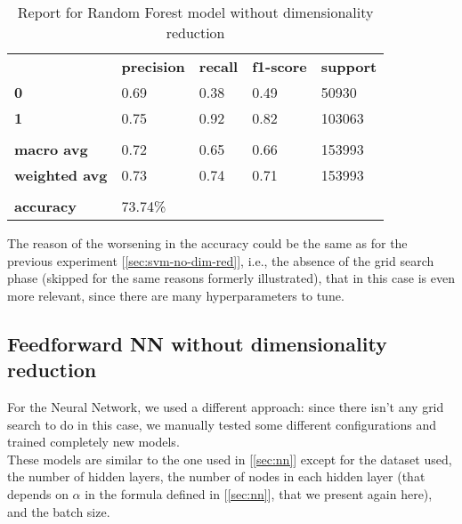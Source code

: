 \begin{table}[h!]
    \centering
    \begin{tabular}{lllll}
        \rowcolor[HTML]{EEEEEE} 
        \cellcolor[HTML]{FBFBFB} & \textbf{precision} & \textbf{recall} & \textbf{f1-score} & \textbf{support} \\
        \rowcolor[HTML]{EEEEEE} 
        \textbf{0}               & 0.69               & 0.38            & 0.49              & 50930            \\
        \rowcolor[HTML]{EEEEEE} 
        \textbf{1}               & 0.75               & 0.92            & 0.82              & 103063           \\
        \rowcolor[HTML]{FBFBFB} 
        &                    &                 &                   &                  \\
        \rowcolor[HTML]{EEEEEE} 
        \textbf{macro avg}       & 0.72               & 0.65            & 0.66              & 153993           \\
        \rowcolor[HTML]{EEEEEE} 
        \textbf{weighted avg}    & 0.73               & 0.74            & 0.71              & 153993           \\
        \rowcolor[HTML]{FBFBFB} 
        &                    &                 &                   &                  \\
        \rowcolor[HTML]{EEEEEE} 
        \textbf{accuracy}        & \multicolumn{4}{l}{\cellcolor[HTML]{EEEEEE}73.74\%}                         
    \end{tabular}
    \caption{Report for Random Forest model without dimensionality reduction}
    \label{tab:rf-res-no-dim-red}
\end{table}

The reason of the worsening in the accuracy could be the same as for the previous experiment [\ref{sec:svm-no-dim-red}], i.e., the absence of the grid search phase (skipped for the same reasons formerly illustrated), that in this case is even more relevant, since there are many hyperparameters to tune.


\newpage
\subsection{Feedforward NN without dimensionality reduction} \label{sec:nn-no-dim-red}

For the Neural Network, we used a different approach: since there isn't any grid search to do in this case, we manually tested some different configurations and trained completely new models.\\
These models are similar to the one used in [\ref{sec:nn}] except for the dataset used, the number of hidden layers, the number of nodes in each hidden layer (that depends on $\alpha$ in the formula defined in [\ref{sec:nn}], that we present again here), and the batch size.

